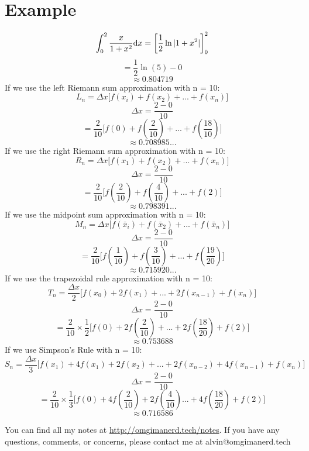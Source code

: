 \documentclass{math}
\begin{document}
\section*{Example}
\[ \int_{0}^{2}{\frac{x}{1+x^{2}}\mathrm{d}{x}} =
   \bigg[\frac{1}{2}\ln|1+x^{2}|\bigg]_{0}^{2} \]
\[ = \frac{1}{2}\ln(5)-0 \]
\[ \approx 0.804719 \]
If we use the left Riemann sum approximation with n = 10:
\[ L_{n} = \Delta x\bigg[f(x_{i})+f(x_{2})+...+f(x_{n})\bigg] \]
\[ \Delta x = \frac{2-0}{10} \]
\[ = \frac{2}{10}\bigg[f(0)+f(\frac{2}{10})+...+f(\frac{18}{10})\bigg] \]
\[ \approx 0.708985... \]
If we use the right Riemann sum approximation with n = 10:
\[ R_{n} = \Delta x\bigg[f(x_{1})+f(x_{2})+...+f(x_{n})\bigg] \]
\[ \Delta x = \frac{2-0}{10} \]
\[ = \frac{2}{10}\bigg[f(\frac{2}{10})+f(\frac{4}{10})+...+f(2)\bigg] \]
\[ \approx 0.798391... \]
If we use the midpoint sum approximation with n = 10:
\[ M_{n} = \Delta x\bigg[
   f(\bar{x}_{i})+f(\bar{x}_{2})+...+f(\bar{x}_{n})\bigg] \]
\[ \Delta x = \frac{2-0}{10} \]
\[ = \frac{2}{10}\bigg[
   f(\frac{1}{10})+f(\frac{3}{10})+...+f(\frac{19}{20})\bigg] \]
\[ \approx 0.715920... \]
If we use the trapezoidal rule approximation with n = 10:
\[ T_{n} = \frac{\Delta x}{2}\bigg[
   f(x_{0})+2f(x_{1})+...+2f(x_{n-1})+f(x_{n})\bigg] \]
\[ \Delta x = \frac{2-0}{10} \]
\[ = \frac{2}{10}\times\frac{1}{2}\bigg[
   f(0)+2f(\frac{2}{10})+...+2f(\frac{18}{20})+f(2)\bigg] \]
\[ \approx 0.753688 \]
If we use Simpson's Rule with n = 10:
\[ S_{n} = \frac{\Delta x}{3}\bigg[
   f(x_{1})+4f(x_{1})+2f(x_{2})+...+2f(x_{n-2})+4f(x_{n-1})+f(x_{n})\bigg] \]
\[ \Delta x = \frac{2-0}{10} \]
\[ = \frac{2}{10}\times\frac{1}{3}\bigg[
   f(0)+4f(\frac{2}{10})+2f(\frac{4}{10})...+4f(\frac{18}{20})+f(2)\bigg] \]
\[ \approx 0.716586 \]

\begin{center}
  You can find all my notes at \url{http://omgimanerd.tech/notes}. If you have
  any questions, comments, or concerns, please contact me at
  alvin@omgimanerd.tech
\end{center}
\end{document}
